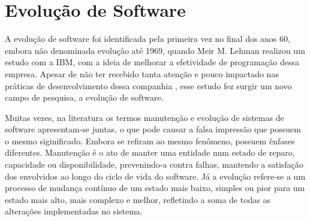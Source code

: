 \section{Evolução de Software}

A evolução de software foi identificada pela primeira vez no final dos anos 60, embora não denominada evolução até 1969, quando Meir M. Lehman realizou um estudo com a IBM, com a ideia de melhorar a efetividade de programação dessa empresa. Apesar de não ter recebido tanta atenção e pouco impactado nas práticas de desenvolvimento dessa companhia , esse estudo fez surgir um novo campo de pesquisa, a evolução de software.

\begin{mdframed}
Muitas vezes, na literatura os termos manutenção e evolução de sistemas de software apresentam-se juntas, o que pode causar a falsa impressão que possuem o mesmo siginificado. Embora se refiram ao mesmo fenômeno, possuem ênfases diferentes. Manutenção é o ato de manter uma entidade num estado de reparo, capacidade ou disponibilidade, prevenindo-a contra falhas, mantendo a satisfação dos envolvidos ao longo do ciclo de vida do software. Já a evolução refere-se a um processo de mudança contínuo de um estado mais baixo, simples ou pior para um estado mais alto, mais complexo e melhor, refletindo a soma de todas as alterações implementadas no sistema.
\end{mdframed}

